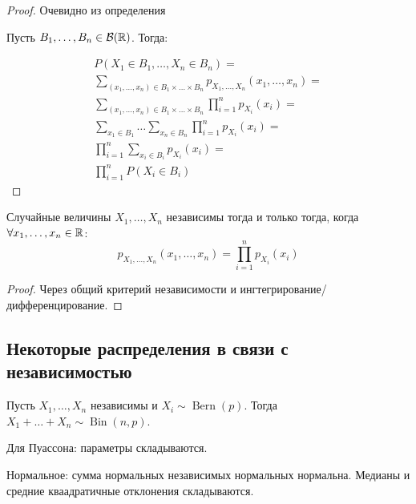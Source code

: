 \documentclass[12pt, a4paper, oneside]{article}
\begin{document}
\begin{proof}
    
    \rightimp Очевидно из определения

    \leftimp Пусть $B_1, \ldots, B_n \in \mathcal{B}({\mathbb{R}})$. Тогда:
    
    \begin{multline}
        P(X_1 \in B_1, \ldots, X_n \in B_n) = \\
        \sum_{(x_1, \ldots, x_n) \in B_1 \times \ldots \times B_n} p_{X_1, \ldots, X_n}(x_1, \ldots, x_n) = \\
        \sum_{(x_1, \ldots, x_n) \in B_1 \times \ldots \times B_n} \prod_{i=1}^{n} p_{X_i}(x_i) = \\
        \sum_{x_1 \in B_1} \ldots \sum_{x_n \in B_n} \prod_{i=1}^{n} p_{X_i}(x_i) = \\
        \prod_{i=1}^{n} \sum_{x_i \in B_i} p_{X_i}(x_i) = \\
        \prod_{i=1}^{n} P(X_i \in B_i)
    \end{multline}
\end{proof}

\begin{theorem}
    Случайные величины $X_1, \ldots, X_n$ независимы тогда и только тогда, когда $\forall x_1, \ldots, x_n \in {\mathbb{R}}$:
    \begin{equation}
        p_{X_1, \ldots, X_n}(x_1, \ldots, x_n) = \prod_{i=1}^{n} p_{X_i}(x_i)
    \end{equation}
\end{theorem}

\begin{proof}
    Через общий критерий независимости и ингтегрирование/дифференцирование.
\end{proof}



\subsection{Некоторые распределения в связи с независимостью}

Пусть $X_1, \ldots, X_n$ независимы и $X_i \sim \operatorname{Bern}(p)$.
Тогда $X_1 + \ldots + X_n \sim \operatorname{Bin}(n, p)$.


Для Пуассона: параметры складываются.

Нормальное: сумма нормальных независимых нормальных нормальна.
Медианы и средние кваадратичные отклонения складываются.
\end{document}
